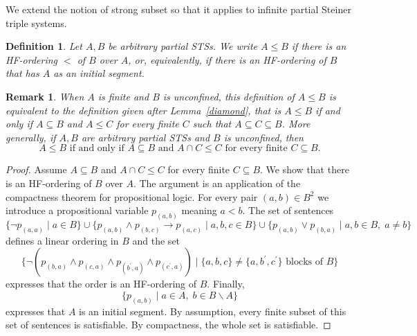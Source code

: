 \documentclass[a4paper, 11pt]{article}
\theoremstyle{note}
\newtheorem{df}[thm]{Definition}
\newtheorem{rmk}[thm]{Remark}
\begin{document}
	We extend the notion of strong subset so that it applies to infinite partial Steiner triple systems. 
\begin{df}  Let $A,B$ be arbitrary partial STSs.
	We write  $A\leq B$ if there is an HF-ordering $<$ of $B$ over $A$, or, equivalently, if there is an HF-ordering of $B$
	that has $A$ as an initial segment.  
\end{df}
	

	
		
	\begin{rmk}\label{Feb_23_2024_6.1} When $A$ is finite and $B$ is unconfined, this definition of $A\leq B$  is equivalent  to the definition given after Lemma~\ref{diamond}, that is  $A\leq B$ if and only if $A\subseteq B$ and $A\leq C$  for every finite $C$ such that  $A\subseteq C\subseteq B$.  More generally, if $A,B$ are arbitrary partial STSs and $B$ is unconfined, then
		$$A\leq B \mbox{ if and only if } A\subseteq B \mbox{ and } A\cap C \leq C \mbox{ for every finite } C\subseteq B.$$
	\end{rmk}
	\begin{proof}  Assume $A \subseteq B$ and $A\cap C\leq C$  for every finite $C\subseteq B$. We show that there is an HF-ordering of $B$  over $A$.  The argument is an application of the compactness theorem for propositional logic.  For every pair $(a,b)\in B^2$  we introduce a propositional variable $p_{(a,b)}$ meaning $a<b$. The set of sentences 
		$$\{\neg p_{(a,a)}\mid a\in B\}\cup\{p_{(a,b)}\wedge p_{(b,c)}\rightarrow p_{(a,c)}\mid a,b,c\in B\}\cup\{p_{(a,b)}\vee p_{(b,a)}\mid a,b\in B,\; a\neq b\}$$
		defines a linear ordering in $B$ and the set 
		$$\{\neg( p_{(b,a)}\wedge p_{(c,a)}\wedge p_{(b^\prime,a)}\wedge p_{(c^\prime,a)})\mid \{a,b,c\}\neq \{a,b^\prime,c^\prime\} \mbox{ blocks  of } B\}$$
		expresses that  the order is an HF-ordering of $B$. Finally, 
		$$\{ p_{(a,b)}\mid   a\in A,\; b\in B\smallsetminus A\}$$
		expresses that $A$ is an initial segment. By assumption, every finite subset of this set of sentences is satisfiable. By compactness, the whole set is satisfiable.
	\end{proof}
	
\end{document}

